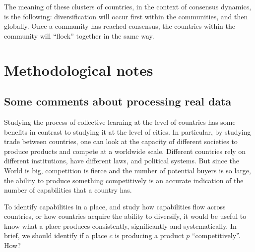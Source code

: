 \documentclass[12pt]{article}
\newcommand{\mtx}[1]{\mathbf{ #1}}
\begin{document}
The meaning of these clusters of countries, in the context of consensus dynamics, is the following: diversification will occur first within the communities, and then globally. Once a community has reached consensus, the countries within the community will ``flock'' together in the same way.














\newpage
\section{Methodological notes}


\subsection{Some comments about processing real data}
Studying the process of collective learning at the level of countries has some benefits in contrast to studying it at the level of cities. In particular, by studying trade between countries, one can look at the capacity of different societies to produce products and compete at a worldwide scale. Different countries rely on different institutions, have different laws, and political systems. But since the World is big, competition is fierce and the number of potential buyers is so large, the ability to produce something competitively is an accurate indication of the number of capabilities that a country has. 

To identify capabilities in a place, and study how capabilities flow across countries, or how countries acquire the ability to diversify, it would be useful to know what a place produces consistently, significantly and systematically. In brief, we should identify if a place $c$ is producing a product $p$ ``competitively''. How? 
\end{document}
